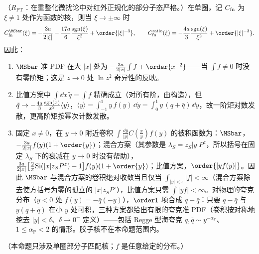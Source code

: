 \begin{proposition}\label{prop:lamet-tails}
（$R_{\mathrm{PT}}$：在重整化微扰论中对红外正规化的部分子态严格。）在单圈，记 $C_{\rm fn}$ 为 $\xi\ne1$ 处作为函数的核，则当 $\xi\to\pm\infty$ 时
\begin{equation}\label{eq:lamet-tails}
C^{\MSbar}_{\rm fn}(\xi)=-\frac{3a}{2|\xi|}-\frac{17a}{6}\frac{{\rm sgn}(\xi)}{\xi^2}+\order{|\xi|^{-3}},\qquad C^{\rm ratio}_{\rm fn}(\xi)=-\frac{4a}{3}\frac{{\rm sgn}(\xi)}{\xi^2}+\order{|\xi|^{-3}}.
\end{equation}%
因此：
\begin{enumerate}[label=(\roman*),leftmargin=2em,itemsep=1pt,topsep=2pt]
\item $\MSbar$ 准 PDF 在大 $|x|$ 处为 $-\frac{3a}{2|x|}\int f+\order{x^{-2}}$——当 $\int f\neq0$ 时没有零阶矩；这是 $z\to0$ 处 $\ln z^2$ 奇异性的反映。
\item 比值方案中 $\int\dd x\,\tilde q=\int f$ 精确成立（对所有阶，由构造），但 $\tilde q\to-\frac{4a}3\frac{{\rm sgn}(x)}{x^2}\langle y\rangle$，$\langle y\rangle=\int_{-1}^1y\,f(y)\,\dd y=\int_0^1y\,(q+\bar q)\,\dd y$，故一阶矩对数发散，更高阶矩按幂次计数发散。
\item 固定 $x\neq0$，在 $y\to0$ 附近卷积 $\int\frac{\dd y}{|y|}C(\frac xy)f(y)$ 的被积函数为：$\MSbar$，$-\frac{3a}{2|x|}f(y)(1+\order{y})$；混合方案（其参数是 $\lambda_S=z_S|y|P^z$，所以括号在固定 $\lambda_S$ 下的衰减在 $y\to0$ 时没有帮助），$\frac{3a}{2|x|}\big[\frac2\pi{\rm Si}(|x|z_SP^z)-1\big]f(y)(1+\order{y})$；比值方案，$\order{|yf(y)|}$。因此 $\MSbar$ 与混合方案的卷积绝对收敛当且仅当 $\int_{|y|<\epsilon}|f|<\infty$（混合方案除去使方括号为零的孤立的 $|x|z_SP^z$），比值方案只需 $\int|yf|<\infty$。对物理的夸克分布（$y<0$ 处 $f(y)=-\bar q(-y)$），$\order1$ 项合成 $q-\bar q$：只要 $q-\bar q$ 与 $y(q+\bar q)$ 在小 $y$ 处可积，三种方案都给出有限的夸克准 PDF（卷积按对称地挖去 $|y|<\delta$、$\delta\to0^+$ 定义）——包括 Regge 型海夸克 $q,\bar q\sim y^{-\alpha_{\mathbb P}}$、$1\le\alpha_{\mathbb P}<2$ 的情形。胶子核不在本命题范围内。
\end{enumerate}
（本命题只涉及单圈部分子匹配核；$f$ 是任意给定的分布。）
\end{proposition}

